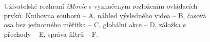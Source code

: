 \begin{figure}[h]
	\centering
	\caption{Uživatelské rozhraní \textit{iMovie} s vyznačeným rozložením ovládacích prvků. Knihovna souborů -- A, náhled výsledného videa -- B, časová osa bez jednotného měřítka -- C, globální akce -- D, záložka s přechody -- E, správa filtrů -- F.}\label{img:imovie}
\end{figure}

